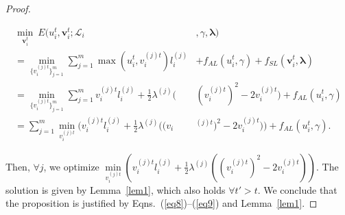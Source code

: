 \documentclass[journal]{IEEEtran}
\begin{document}
{{\begin{proof}
		\begin{small}
			\begin{displaymath}
			\begin{aligned}
			\underset{\mathbf{v}_i^t}{\min} \ E(u_i^t,\mathbf{v}_i^t;\mathcal{L}_i&,\gamma,{\bm \lambda}) \\= \underset{\{v_i^{(j)t}\}^m_{j=1}}{\min}\sum_{j=1}^{m}\max(u_i^t,v_i^{(j)t})l_i^{(j)} &+ f_{AL}(u_i^t,\gamma) + f_{SL}(\mathbf{v}_i^t,{\bm \lambda})\\=
			\underset{\{v_i^{(j)t}\}^m_{j=1}}{\min}\sum_{j=1}^{m}v_i^{(j)t}l_i^{(j)} + \frac{1}{2}\lambda^{(j)}(&(v_i^{(j)t})^2-2v_i^{(j)t}) + f_{AL}(u_i^t,\gamma) \\=
			\sum_{j=1}^{m}\underset{v_i^{(j)t}}{\min}(v_i^{(j)t}l_i^{(j)} + \frac{1}{2}\lambda^{(j)}((v_i&^{(j)t})^2-2v_i^{(j)t})) + f_{AL}(u_i^t,\gamma).
			\end{aligned}
			\end{displaymath}
		\end{small}Then, $\forall j$, we optimize $\underset{v^{(j)t}_i}{\min}(v^{(j)t}_il_i^{(j)} + \frac{1}{2}\lambda^{(j)}((v_i^{(j)t})^2-2v_i^{(j)t}))$. The solution is given by Lemma~\ref{lem1}, which also holds $\forall t'>t$. We conclude that the proposition is justified by Eqns.~(\ref{eq8})--(\ref{eq9}) and Lemma~\ref{lem1}.
\end{proof}
}


\ifCLASSOPTIONcaptionsoff
  \newpage
\fi





%
%
%



}
\end{document}
